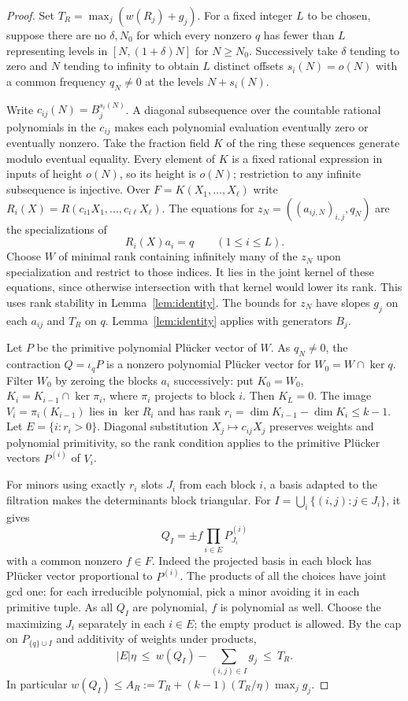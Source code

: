 \documentclass[11pt,a4paper,reqno]{amsart}
\theoremstyle{definition}
\theoremstyle{remark}
\numberwithin{equation}{section}
\begin{document}
\begin{proof}
Set \(T_R=\max_j(w(R_j)+g_j)\). For a fixed integer \(L\) to
be chosen, suppose there are no \(\delta,N_0\) for which every
nonzero \(q\) has fewer than \(L\) representing levels in
\([N,(1+\delta)N]\) for \(N\ge N_0\). Successively take
\(\delta\) tending to zero and \(N\) tending to infinity to
obtain \(L\) distinct offsets \(s_i(N)=o(N)\) with a common
frequency \(q_N\ne0\) at the levels \(N+s_i(N)\).

Write \(c_{ij}(N)=B_j^{s_i(N)}\). A diagonal subsequence
over the countable rational polynomials in the \(c_{ij}\)
makes each polynomial evaluation eventually zero or eventually
nonzero. Take the fraction field \(K\) of the ring these
sequences generate modulo eventual equality. Every element
of \(K\) is a fixed rational expression in inputs of height
\(o(N)\), so its height is \(o(N)\); restriction to any infinite
subsequence is injective. Over \(F=K(X_1,\ldots,X_\ell)\)
write \(R_i(X)=R(c_{i1}X_1,\ldots,c_{i\ell}X_\ell)\).
The equations for \(z_N=((a_{ij,N})_{i,j},q_N)\) are the
specializations of
\[
                       R_i(X)a_i=q\qquad(1\le i\le L).
\]
Choose \(W\) of minimal rank containing infinitely many of the
\(z_N\) upon specialization and restrict to those indices.
It lies in the joint kernel of these equations, since otherwise
intersection with that kernel would lower its rank. This
uses rank stability in Lemma~\ref{lem:identity}. The bounds
for \(z_N\) have slopes \(g_j\) on each \(a_{ij}\) and \(T_R\)
on \(q\). Lemma~\ref{lem:identity} applies with generators \(B_j\).

Let \(P\) be the primitive polynomial Pl\"ucker vector of
\(W\). As \(q_N\ne0\), the contraction \(Q=\iota_q P\) is
a nonzero polynomial Pl\"ucker vector for \(W_0=W\cap\ker q\).
Filter \(W_0\) by zeroing the blocks \(a_i\) successively:
put \(K_0=W_0\), \(K_i=K_{i-1}\cap\ker\pi_i\), where
\(\pi_i\) projects to block \(i\). Then \(K_L=0\). The image
\(V_i=\pi_i(K_{i-1})\) lies in \(\ker R_i\) and has rank
\(r_i=\dim K_{i-1}-\dim K_i\le k-1\).
Let \(E=\{i:r_i>0\}\). Diagonal substitution \(X_j\mapsto
c_{ij}X_j\) preserves weights and polynomial primitivity, so
the rank condition applies to the primitive Pl\"ucker vectors
\(P^{(i)}\) of \(V_i\).

For minors using exactly \(r_i\) slots \(J_i\) from each
block \(i\), a basis adapted to the filtration makes the
determinants block triangular. For \(I=\bigcup_i\{(i,j):j\in
J_i\}\), it gives
\[
                 Q_I=\pm f\prod_{i\in E}P^{(i)}_{J_i}
\]
with a common nonzero \(f\in F\). Indeed the projected basis
in each block has Pl\"ucker vector proportional to \(P^{(i)}\).
The products of all the choices have joint gcd one: for each
irreducible polynomial, pick a minor avoiding it in each
primitive tuple. As all \(Q_I\) are polynomial, \(f\) is
polynomial as well. Choose the maximizing \(J_i\) separately
in each \(i\in E\); the empty product is allowed. By the cap
on \(P_{\{q\}\cup I}\) and additivity of weights under products,
\[
      |E|\eta\ \le\ w(Q_I)-\sum_{(i,j)\in I}g_j\ \le\ T_R .
\]
In particular \(w(Q_I)\le A_R:=T_R+(k-1)(T_R/\eta)\max_j g_j\).


\end{proof}
\end{document}
